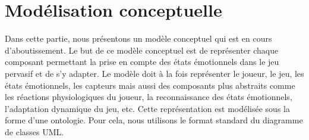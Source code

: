 \documentclass[11pt]{article}
\begin{document}
\section{Modélisation conceptuelle}\label{sec:modelisation}
	Dans cette partie, nous présentons un modèle conceptuel qui est en cours d'aboutissement.
	Le but de ce modèle conceptuel est de représenter chaque composant permettant la prise en compte des états émotionnels dans le jeu pervasif et de s'y adapter.
	Le modèle doit à la fois représenter le joueur, le jeu, les états émotionnels, les capteurs mais aussi des composants plus abstraits comme les réactions physiologiques du joueur, la reconnaissance des états émotionnels, l'adaptation dynamique du jeu, etc.
	Cette représentation est modélisée sous la forme d'une ontologie.
	Pour cela, nous utilisons le format standard du diagramme de classes UML.
\end{document}
